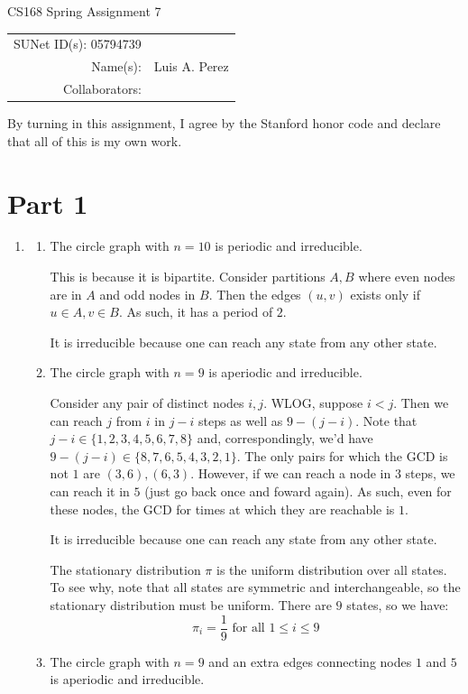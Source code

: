 \documentclass[12pt]{article}
\begin{document}
\begin{center}
{\Large CS168 Spring Assignment 7}

\begin{tabular}{rl}
SUNet ID(s): 05794739 & \\
Name(s): & Luis A. Perez \\
Collaborators: &
\end{tabular}
\end{center}

By turning in this assignment, I agree by the Stanford honor code and declare
that all of this is my own work.

\section*{Part 1}

\begin{enumerate}[label=(\alph*)]
  \item
    \begin{enumerate}
      \item The circle graph with $n=10$ is periodic and irreducible.

      This is because it is bipartite. Consider partitions $A,B$ where even nodes are in $A$ and odd nodes in $B$. Then the edges $(u,v)$ exists only if $u \in A, v \in B$. As such, it has a period of $2$.

      It is irreducible because one can reach any state from any other state.
      \item The circle graph with $n=9$ is aperiodic and irreducible.

      Consider any pair of distinct nodes $i,j$. WLOG, suppose $i < j$. Then we can reach $j$ from $i$ in $j-i$ steps as well as $9 - (j-i)$. Note that $j - i \in \{1, 2, 3, 4, 5, 6, 7, 8\}$ and, correspondingly, we'd have $9 - (j-i) \in \{8, 7, 6, 5, 4, 3, 2, 1\}$. The only pairs for which the GCD is not $1$ are $(3, 6), (6,3)$. However, if we can reach a node in $3$ steps, we can reach it in $5$ (just go back once and foward again). As such, even for these nodes, the GCD for times at which they are reachable is $1$.

      It is irreducible because one can reach any state from any other state.

      The stationary distribution $\pi$ is the uniform distribution over all states. To see why, note that all states are symmetric and interchangeable, so the stationary distribution must be uniform. There are $9$ states, so we have:
      \[
        \pi_i = \frac{1}{9} \text{ for all } 1 \leq i \leq 9
      \]
      \item The circle graph with $n=9$ and an extra edges connecting nodes $1$ and $5$ is aperiodic and irreducible.


\end{enumerate}
\end{enumerate}
\end{document}
